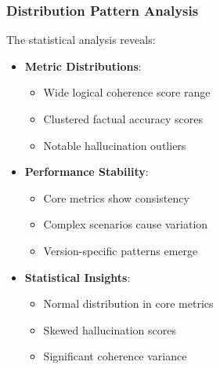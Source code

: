 \subsubsection{Distribution Pattern Analysis}
The statistical analysis reveals:
\begin{itemize}
    \item \textbf{Metric Distributions}:
    \begin{itemize}
        \item Wide logical coherence score range
        \item Clustered factual accuracy scores
        \item Notable hallucination outliers
    \end{itemize}
    \item \textbf{Performance Stability}:
    \begin{itemize}
        \item Core metrics show consistency
        \item Complex scenarios cause variation
        \item Version-specific patterns emerge
    \end{itemize}
    \item \textbf{Statistical Insights}:
    \begin{itemize}
        \item Normal distribution in core metrics
        \item Skewed hallucination scores
        \item Significant coherence variance
    \end{itemize}
\end{itemize}

